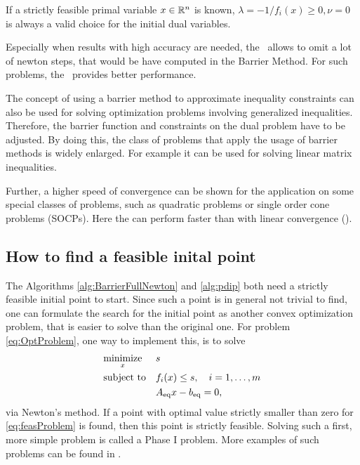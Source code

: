 \begin{remark} \label{re:dualinit}
	If a strictly feasible primal variable $ x \in \mathbb{R}^n $ is known, $ \lambda= -1/f_i(x) \geq 0, \nu=0 $ is always a valid choice for the initial dual variables.
\end{remark}
 
 Especially when results with high accuracy are needed, the \pdm \ allows to omit a lot of newton steps, that would be have computed in the Barrier Method. For such problems, the \pdm \ provides better performance.
 \begin{remark}
 	The concept of using a barrier method to approximate inequality constraints can also be used for solving optimization problems involving generalized inequalities. Therefore, the barrier function and constraints on the dual problem have to be adjusted. By doing this, the class of problems that apply the usage of barrier methods is widely enlarged. For example it can be used for solving linear matrix inequalities.
 \end{remark}
 
 Further, a higher speed of convergence can be shown for the application on some special classes of problems, such as quadratic problems or single order cone problems (SOCPs). Here the \pdm can perform faster  than with linear convergence (\cite{BV}).
 
 
 
\subsection{How to find a feasible inital point}
The Algorithms \ref{alg:BarrierFullNewton} and \ref{alg:pdip} both need a strictly feasible initial point to start. Since such a point is in general not trivial to find, one can formulate the search for the initial point as another convex optimization problem, that is easier to solve than the original one.  
For problem \eqref{eq:OptProblem}, one way to implement this, is to solve
\begin{equation}
	\begin{aligned} & \underset{x}{\text{minimize}} & & s\\ & \text{subject to} & & f_i(x) \leq s, \quad i=1,\dots,m\\ & & &{A}_{\mathrm{eq}} x - {b}_{\mathrm{eq}} = 0, \; \end{aligned}
	\label{eq:feasProblem}
\end{equation}
via Newton's method. If a point with optimal value strictly smaller than zero for \eqref{eq:feasProblem} is found, then this point is strictly feasible. Solving such a first, more simple problem is called a Phase I problem. More examples of such problems can be found in \cite{BV}.








